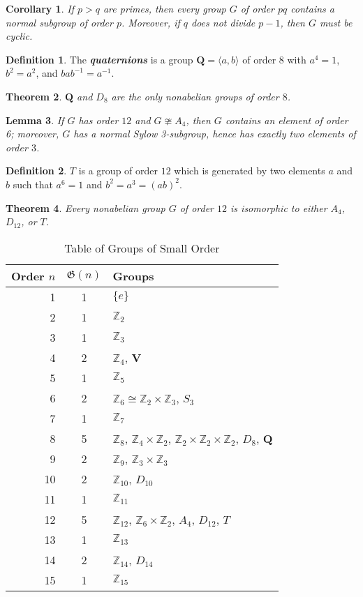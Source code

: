 \documentclass[12pt]{report}
\newtheorem{theorem}{Theorem}[chapter]
\newtheorem{corollary}[theorem]{Corollary}
\newtheorem{lemma}[theorem]{Lemma}
\theoremstyle{definition}
\newtheorem*{definition}{Definition}
\newcommand{\term}[1]{\textbf{\textit{#1}}}
\begin{document}
\begin{corollary}
	If $p>q$ are primes, then every group $G$ of order $pq$ contains a normal subgroup of order $p$. Moreover, if $q$ does not divide $p-1$, then $G$ must be cyclic.
\end{corollary}

\begin{definition}
	The \term{quaternions} is a group $\mathbf{Q}=\langle a,b\rangle$ of order $8$ with $a^4=1$, $b^2=a^2$, and $bab^{-1}=a^{-1}$.
\end{definition}

\begin{theorem}
  $\mathbf{Q}$ and $D_8$ are the only nonabelian groups of order $8$.
\end{theorem}

\begin{lemma}
	If $G$ has order $12$ and $G\ncong A_4$, then $G$ contains an element of order 6; moreover, $G$ has a normal Sylow 3-subgroup, hence has exactly two elements of order $3$.
\end{lemma}

\begin{definition}
	$T$ is a group of order $12$ which is generated by two elements $a$ and $b$ such that $a^6=1$ and $b^2=a^3=(ab)^2$.
\end{definition}

\begin{theorem}
	Every nonabelian group $G$ of order $12$ is isomorphic to either $A_4$, $D_{12}$, or $T$.
\end{theorem}

\begin{table}[]
\centering
\caption*{Table of Groups of Small Order}
\label{my-label}
\begin{tabular}{r|c|l}
\hline
Order $n$ & $\mathfrak{G}(n)$ & Groups \\ \hline
 1 & 1 & $\{e\}$ \\
 2 & 1 & $\mathbb{Z}_2$ \\
 3 & 1 & $\mathbb{Z}_3$ \\
 4 & 2 & $\mathbb{Z}_4$, $\mathbf{V}$ \\
 5 & 1 & $\mathbb{Z}_5$ \\
 6 & 2 & $\mathbb{Z}_6 \cong \mathbb{Z}_2 \times \mathbb{Z}_3$, $S_3$ \\
 7 & 1 & $\mathbb{Z}_7$ \\
 8 & 5 & $\mathbb{Z}_8$, $\mathbb{Z}_4 \times \mathbb{Z}_2$, $\mathbb{Z}_2 \times \mathbb{Z}_2 \times \mathbb{Z}_2$, $D_8$, $\mathbf{Q}$ \\
 9 & 2 & $\mathbb{Z}_9$, $\mathbb{Z}_3 \times \mathbb{Z}_3$ \\
10 & 2 & $\mathbb{Z}_{10}$, $D_{10}$ \\
11 & 1 & $\mathbb{Z}_{11}$ \\
12 & 5 & $\mathbb{Z}_{12}$, $\mathbb{Z}_6 \times \mathbb{Z}_2$, $A_4$, $D_{12}$, $T$ \\
13 & 1 & $\mathbb{Z}_{13}$ \\
14 & 2 & $\mathbb{Z}_{14}$, $D_{14}$ \\
15 & 1 & $\mathbb{Z}_{15}$
\end{tabular}
\end{table}
\end{document}
